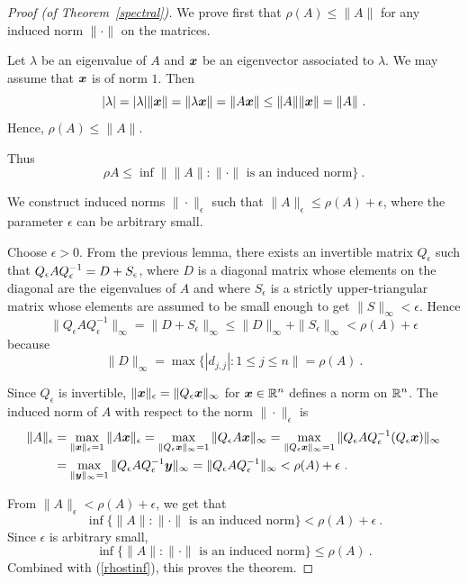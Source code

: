 \begin{proof}[Proof (of Theorem~\ref{spectral})]
 We prove first that $\rho (A) \leq \| A \|$ for any
induced norm $\|\cdot\|$ on the \nn matrices.

Let $\lambda$ be an eigenvalue of $A$ and $\bm{x}$ be an eigenvector
associated to $\lambda$.  We may assume that $\bm{x}$ is of norm
$1$.  Then
\[
|\lambda| = |\lambda| \|\VEC{x}\| = 
\|\lambda \VEC{x}\| = \| A\VEC{x} \| \leq \|A\| \|\VEC{x}\| = \|A\| \ .
\]
Hence, $\rho(A) \leq \|A\|$.

Thus
\begin{equation}\label{rhostinf}
\rho{A} \leq \inf \| \|A\| : \|\cdot\| \text{ is an induced norm} \} \ .
\end{equation}

 We construct induced norms $\|\cdot\|_\epsilon$
such that $\|A\|_\epsilon \leq \rho(A) + \epsilon$, where the parameter
$\epsilon$ can be arbitrary small.

Choose $\epsilon >0$.  From the previous lemma, there exists an
invertible matrix $Q_\epsilon$ such that
$\displaystyle Q_\epsilon A Q_\epsilon^{-1} = D + S_\epsilon$, where $D$ is a
diagonal matrix whose elements on the diagonal are the eigenvalues of
$A$ and where $S_\epsilon$ is a strictly upper-triangular matrix whose
elements are assumed to be small enough to get
$\|S\|_\infty < \epsilon$. 
Hence
\[
\|Q_\epsilon A Q_\epsilon^{-1}\|_\infty = \|D+S_\epsilon\|_\infty
\leq \|D\|_\infty + \|S_\epsilon\|_\infty
< \rho(A) + \epsilon
\]
because
\[
\|D\|_\infty = \max\{ |d_{j,j}| : 1 \leq j \leq n \| = \rho(A) \ .
\]

Since $Q_\epsilon$ is invertible,
$\|\bm{x}\|_\epsilon = \|Q_\epsilon\bm{x}\|_\infty$ for
$\displaystyle \bm{x} \in \mathbb{R}^n$
defines a norm on $\displaystyle \mathbb{R}^n$.  The induced norm of $A$ with
respect to the norm $\|\cdot\|_\epsilon$ is
\begin{align*}
\|A\|_\epsilon &= \max_{\|\bm{x}\|_\epsilon=1} \|A\bm{x}\|_\epsilon
= \max_{\|Q_\epsilon \bm{x}\|_\infty=1} \|Q_\epsilon A\bm{x}\|_\infty
= \max_{\|Q_\epsilon \bm{x}\|_\infty=1}
\|Q_\epsilon A Q_\epsilon^{-1}(Q_\epsilon \bm{x})\|_\infty \\
&= \max_{\|\bm{y}\|_\infty=1} \|Q_\epsilon A Q_\epsilon^{-1}\bm{y}\|_\infty
= \|Q_\epsilon A Q_\epsilon^{-1}\|_\infty < \rho(A) + \epsilon \ .
\end{align*}

 From $\| A \|_\epsilon < \rho(A) + \epsilon$, we get that
\[
\inf \{ \|A\| : \|\cdot\| \text{ is an induced norm} \} < \rho(A) +
\epsilon \ .
\]
Since $\epsilon$ is arbitrary small, 
\[
\inf \{ \|A\| : \|\cdot\| \text{ is an induced norm} \} \leq \rho(A) \ .
\]
Combined with (\ref{rhostinf}), this proves the theorem.
\end{proof}

